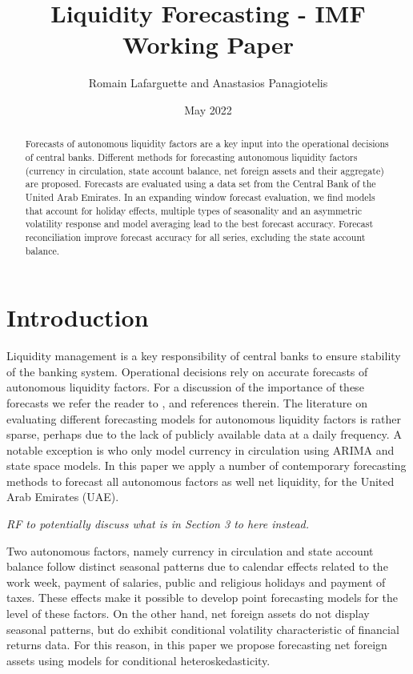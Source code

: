 \documentclass{article}
\title{Liquidity Forecasting - IMF Working Paper}
\author{Romain Lafarguette and Anastasios Panagiotelis}
\date{May 2022}
\begin{document}
\maketitle

\begin{abstract}
    Forecasts of autonomous liquidity factors are a key input into the operational decisions of central banks. Different methods for forecasting autonomous liquidity factors (currency in circulation, state account balance, net foreign assets and their aggregate) are proposed. Forecasts are evaluated using a data set from the Central Bank of the United Arab Emirates. In an expanding window forecast evaluation, we find models that account for holiday effects, multiple types of seasonality and an asymmetric volatility response and model averaging lead to the best forecast accuracy. Forecast reconciliation improve forecast accuracy for all series, excluding the state account balance.
\end{abstract}

\section{Introduction}

Liquidity management is a key responsibility of central banks to ensure stability of the banking system. Operational decisions rely on accurate forecasts of autonomous liquidity factors. For a discussion of the importance of these forecasts we refer the reader to \citet{Bin2001}, \citet{VeyGuo2019} and references therein. The literature on evaluating different forecasting models for autonomous liquidity factors is rather sparse, perhaps due to the lack of publicly available data at a daily frequency. A notable exception is \citet{CabEtAl2009} who only model currency in circulation using ARIMA and state space models. In this paper we apply a number of contemporary forecasting methods to forecast all autonomous factors as well net liquidity, for the United Arab Emirates (UAE).

{\textit{\color{blue} RF to potentially discuss what is in Section 3 to here instead.}}

Two autonomous factors, namely currency in circulation and state account balance follow distinct seasonal patterns due to calendar effects related to the work week, payment of salaries, public and religious holidays and payment of taxes. These effects make it possible to develop point forecasting models for the level of these factors. On the other hand, net foreign assets do not display seasonal patterns, but do exhibit conditional volatility characteristic of financial returns data. For this reason, in this paper we propose forecasting net foreign assets using models for conditional heteroskedasticity.
\end{document}
